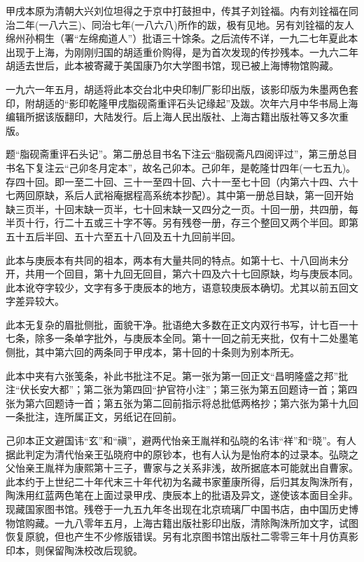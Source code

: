 甲戌本原为清朝大兴刘位坦得之于京中打鼓担中，传其子刘铨福。内有刘铨福在同治二年(一八六三)、同治七年(一八六八)所作的跋，极有见地。另有刘铨福的友人绵州孙桐生（署“左绵痴道人”）批语三十馀条。之后流传不详，一九二七年夏此本出现于上海，为刚刚归国的胡适重价购得，是为首次发现的传抄残本。一九六二年胡适去世后，此本被寄藏于美国康乃尔大学图书馆，现已被上海博物馆购藏。

一九六一年五月，胡适将此本交台北中央印制厂影印出版，该影印版为朱墨两色套印，附胡适的“影印乾隆甲戌脂砚斋重评石头记缘起”及跋。次年六月中华书局上海编辑所据该版翻印，大陆发行。后上海人民出版社、上海古籍出版社等又多次重版。

{}

题“脂砚斋重评石头记”。第二册总目书名下注云“脂砚斋凡四阅评过”，第三册总目书名下复注云“己卯冬月定本”，故名己卯本。己卯年，是乾隆廿四年(一七五九)。存四十回。即一至二十回、三十一至四十回、六十一至七十回（内第六十四、六十七两回原缺，系后人武裕庵据程高系统本抄配）。其中第一册总目缺，第一回开始缺三页半，十回末缺一页半，七十回末缺一又四分之一页。十回一册，共四册，每半页十行，行二十五或三十字不等。另有残卷一册，存三个整回又两个半回。即第五十五后半回、五十六至五十八回及五十九回前半回。

此本与庚辰本有共同的祖本，两本有大量共同的特点。如第十七、十八回尚未分开，共用一个回目，第十九回无回目，第六十四及六十七回原缺，均与庚辰本同。此本讹夺字较少，文字有多于庚辰本的地方，语意较庚辰本确切。尤其以前五回文字差异较大。

此本无复杂的眉批侧批，面貌干净。批语绝大多数在正文内双行书写，计七百一十七条，除多一条单字批外，与庚辰本全同。第十一回之前无夹批，仅有十二处墨笔侧批，其中第六回的两条同于甲戌本，第十回的十条则为别本所无。

此本中夹有六张笺条，补此书批注不足。第一张为第一回正文“昌明隆盛之邦”批注“伏长安大都”；第二张为第四回“护官符小注”；第三张为第五回题诗一首；第四张为第六回题诗一首；第五张为第二回前指示将总批低两格抄；第六张为第十九回一条批注，连所属正文，另纸记在回前。

己卯本正文避国讳“玄”和“禛”，避两代怡亲王胤祥和弘晓的名讳“祥”和“晓”。有人据此判定为清代怡亲王弘晓府中的原钞本，也有人认为是怡府本的过录本。弘晓之父怡亲王胤祥为康熙第十三子，曹家与之关系非浅，故所据底本可能就出自曹家。此本约于上世纪二十年代末三十年代初为名藏书家董康所得，后归其友陶洙所有，陶洙用红蓝两色笔在上面过录甲戌、庚辰本上的批语及异文，遂使该本面目全非。现藏国家图书馆。残卷于一九五九年冬出现在北京琉璃厂中国书店，由中国历史博物馆购藏。一九八零年五月，上海古籍出版社影印出版，清除陶洙所加文字，试图恢复原貌，但也产生不少修版错误。另有北京图书馆出版社二零零三年十月仿真影印本，则保留陶洙校改后现貌。

